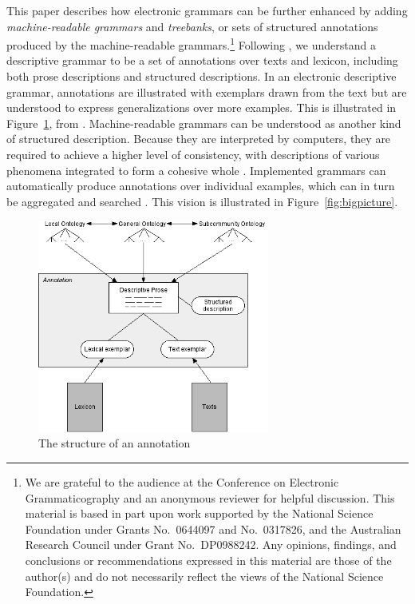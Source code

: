 \documentclass[12pt]{article}
\begin{document}
This paper describes how electronic grammars can be further enhanced by
adding {\it machine-readable grammars} and {\it treebanks}, or sets of
structured annotations produced by the machine-readable
grammars.\footnote{We are grateful to the audience at the Conference on
  Electronic Grammaticography and an anonymous reviewer for helpful
  discussion.  This material is based in part upon work supported by the
  National Science Foundation under Grants No.\ 0644097 and No.\
  0317826, and the Australian Research Council under Grant No.\
  DP0988242.  Any opinions, findings, and conclusions or recommendations
  expressed in this material are those of the author(s) and do not
  necessarily reflect the views of the National Science Foundation.  }
Following \namecite{Good:04}, we understand a descriptive grammar to be
a set of annotations over texts and lexicon, including both prose
descriptions and structured descriptions.  In an electronic descriptive
grammar, annotations are illustrated with exemplars drawn from the text
but are understood to express generalizations over more examples.  This
is illustrated in Figure~\ref{fig:good}, from \citeboth{Good:04}.
Machine-readable grammars can be understood as another kind of
structured description.  Because they are interpreted by computers, they
are required to achieve a higher level of consistency, with descriptions
of various phenomena integrated to form a cohesive whole
\cite{Bender:08}. Implemented grammars can automatically produce
annotations over individual examples, which can in turn be aggregated
and searched \cite{Gho:Bir:10}.  This vision is illustrated in
Figure~\ref{fig:bigpicture}.


\begin{figure}[hb]
\centering
\includegraphics[width=3in]{Annotation}
\caption{The structure of an annotation \protect\cite{Good:04}}
\label{fig:good}
\end{figure}
\end{document}
